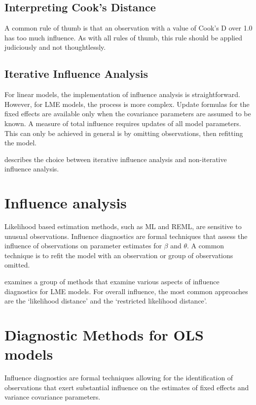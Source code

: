 \documentclass[12pt, a4paper]{article}
\begin{document}
			
			\subsection{Interpreting Cook's Distance}
			A common rule of thumb is that an observation with a value of Cook's D over 1.0 has too much influence. As with all rules of thumb, this rule should be applied judiciously and not thoughtlessly.

			\subsection{Iterative Influence Analysis}
			
			
			For linear models, the implementation of influence analysis is straightforward.
			However, for LME models, the process is more complex. Update formulas for the fixed effects are available only when the covariance parameters are assumed to be known. A measure of total influence requires updates of all model parameters.
			This can only be achieved in general is by omitting observations, then refitting the model.
			
			
			\citet{schabenberger} describes the choice between  iterative influence analysis and  non-iterative influence analysis.
			
			
			\section{Influence analysis} %
			
			
			Likelihood based estimation methods, such as ML and REML, are sensitive to unusual observations. Influence diagnostics are formal techniques that assess the influence of observations on parameter estimates for $\beta$ and $\theta$. A common technique is to refit the model with an observation or group of observations omitted.
			
			
			\citet{west} examines a group of methods that examine various aspects of influence diagnostics for LME models.
			For overall influence, the most common approaches are the `likelihood distance' and the `restricted likelihood distance'.
			
			
			
			
			\section*{Diagnostic Methods for OLS models}
			Influence diagnostics are formal techniques allowing for the identification of observations that exert substantial 
			influence on the estimates of fixed effects and variance covariance parameters. 
			
\end{document}
